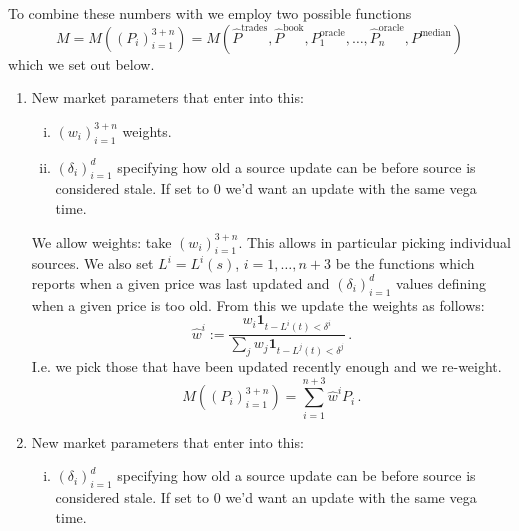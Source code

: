 \documentclass[10pt]{article}
\begin{document}
To combine these numbers with we employ two possible functions 
\[
M=M((P_i)_{i=1}^{3+n}) = M(\hat P^{\text{trades}}, \hat P^{\text{book}}, P^{\text{oracle}}_1,\ldots,\hat P^{\text{oracle}}_n,P^{\text{median}})
\] 
which we set out below. 
\begin{enumerate}
\item 
New market parameters that enter into this:
\begin{enumerate}[i)]
\item $(w_i)_{i=1}^{3+n}$ weights.
\item $(\delta_i)_{i=1}^d$ specifying how old a source update can be before source is considered stale. If set to $0$ we'd want an update with the same vega time.
\end{enumerate}

We allow weights: take $(w_i)_{i=1}^{3+n}$. This allows in particular picking individual sources. 
We also set $L^{i}=L^{i}(s)$, $i=1,\ldots,n+3$ be the functions which reports when a given price was last updated and $(\delta_i)_{i=1}^d$ values defining when a given price is too old. 
From this we update the weights as follows:
\[
\hat w^i := \frac{w_i \mathbf{1}_{t-L^i(t)<\delta^i}}{\sum_j w_j\mathbf{1}_{t-L^j(t)<\delta^j}}\,.
\]
I.e. we pick those that have been updated recently enough and we re-weight. 
\[
M((P_i)_{i=1}^{3+n}) = \sum_{i=1}^{n+3} \hat w^i P_i \,.
\]
\item 
New market parameters that enter into this:
\begin{enumerate}[i)]
\item $(\delta_i)_{i=1}^d$ specifying how old a source update can be before source is considered stale. If set to $0$ we'd want an update with the same vega time.
\end{enumerate}



\end{enumerate}
\end{document}
